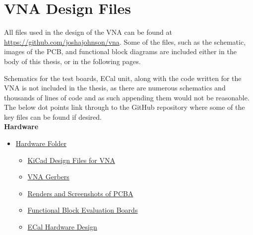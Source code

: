 \section{VNA Design Files}
\label{appen:vna_design_files}

All files used in the design of the VNA can be found at \url{https://github.com/joshajohnson/vna}. 
Some of the files, such as the schematic, images of the PCB, and functional block diagrams are included either in the body of this thesis, or in the following pages. 

Schematics for the test boards, ECal unit, along with the code written for the VNA is not included in the thesis, as there are numerous schematics and thousands of lines of code and as such appending them would not be reasonable. The below dot points link through to the GitHub repository where some of the key files can be found if desired. \\

\textbf{Hardware}
\begin{itemize}
	\item \href{https://github.com/joshajohnson/vna/tree/master/Hardware}{Hardware Folder}

\begin{itemize}
	\item \href{https://github.com/joshajohnson/vna/tree/master/Hardware/VNAv0}{KiCad Design Files for VNA}
	\item \href{https://github.com/joshajohnson/vna/tree/master/Hardware/VNAv0/gerbers}{VNA Gerbers}
	\item \href{https://github.com/joshajohnson/vna/tree/master/Hardware/VNAv0/renders_screenshots}{Renders and Screenshots of PCBA}
	\item \href{https://github.com/joshajohnson/vna/tree/master/Hardware/Test\%20Boards}{Functional Block Evaluation Boards}
	\item \href{https://github.com/joshajohnson/vna/tree/master/Hardware/Ecal}{ECal Hardware Design}\\
\end{itemize}
\end{itemize}

